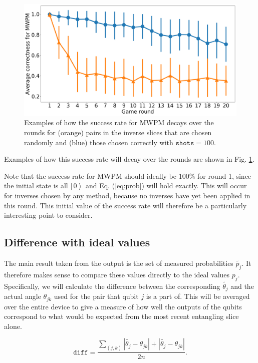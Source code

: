 \documentclass[aps,prl,twocolumn,showpacs,preprintnumbers]{revtex4-1}
\newcommand{\be}{\begin{equation}}
\newcommand{\ee}{\end{equation}}
\newcommand{\ket}[1]{\left | \, #1 \right\rangle}
\begin{document}
\begin{figure}[ht]
	\centering
    \includegraphics[width=\columnwidth]{figures/example_mwpm.png}
	\caption{Examples of how the success rate for MWPM decays over the rounds for (orange) pairs in the inverse slices that are chosen randomly and (blue) those chosen correctly with $\mathtt{shots}=100$.}\label{fig:mwpm}
\end{figure}

Examples of how this success rate will decay over the rounds are shown in Fig. \ref{fig:mwpm}.

Note that the success rate for MWPM should ideally be $100\%$ for round 1, since the initial state is all $\ket{0}$ and Eq. (\ref{eq:prob}) will hold exactly. This will occur for inverses chosen by any method, because no inverses have yet been applied in this round. This initial value of the success rate will therefore be a particularly interesting point to consider.

\subsection{Difference with ideal values}

The main result taken from the output is the set of measured probabilities $\tilde{p_j}$. It therefore makes sense to compare these values directly to the ideal values $p_j$. Specifically, we will calculate the difference between the corresponding $\tilde{\theta_j}$ and the actual angle $\theta_{jk}$ used for the pair that qubit $j$ is a part of. This will be averaged over the entire device to give a measure of how well the outputs of the qubits correspond to what would be expected from the most recent entangling slice alone.

\be
\mathtt{diff} = \frac{ \sum_{(j,k)} | \tilde{\theta_j} - \theta_{jk} | + | \tilde{\theta_j} - \theta_{jk} | }{ 2 n }.
\ee
\end{document}

